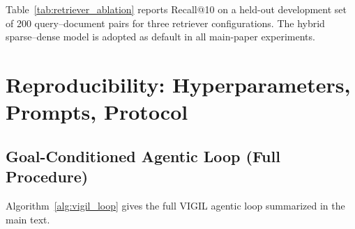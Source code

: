Table~\ref{tab:retriever_ablation} reports Recall@10 on a held-out development set of 200 query--document pairs for three retriever configurations. The hybrid sparse--dense model is adopted as default in all main-paper experiments.

\begin{table}[h]
\centering
\caption{Retriever ablation. Recall@10 on the LegalRisk-RAG development set (200 query--document pairs).}
\label{tab:retriever_ablation}
\small
\setlength{\tabcolsep}{4pt}
\end{table}

\section{Reproducibility: Hyperparameters, Prompts, Protocol}
\label{app:repro}

\subsection{Goal-Conditioned Agentic Loop (Full Procedure)}

Algorithm~\ref{alg:vigil_loop} gives the full VIGIL agentic loop summarized in the main text.

